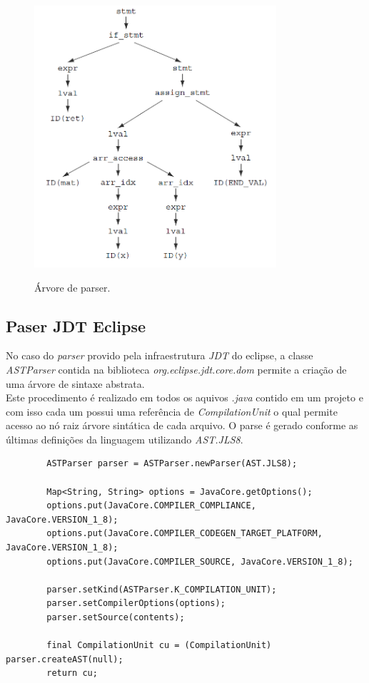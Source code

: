 	\begin{figure}[h]
		\center
		\includegraphics[width=0.8\textwidth]{Imagens/Arvore}
		\label{fig:TreeParser}
		\caption{Árvore de parser.}
	\end{figure}
	
	
	\subsection{Paser JDT Eclipse}
	No caso do \textit{parser} provido pela infraestrutura \textit{JDT} do eclipse,  a classe \textit{ASTParser} contida na biblioteca \textit{org.eclipse.jdt.core.dom} permite a criação de uma árvore de sintaxe abstrata.\\
	Este procedimento é realizado em todos os aquivos \textit{.java} contido em um projeto e com isso cada um possui uma referência de \textit{CompilationUnit} o qual permite acesso ao nó raiz árvore sintática de cada arquivo. O parse é gerado conforme as últimas definições da linguagem utilizando \textit{AST.JLS8}.\

	\begin{lstlisting}
		ASTParser parser = ASTParser.newParser(AST.JLS8);
		
		Map<String, String> options = JavaCore.getOptions();
		options.put(JavaCore.COMPILER_COMPLIANCE, JavaCore.VERSION_1_8);
		options.put(JavaCore.COMPILER_CODEGEN_TARGET_PLATFORM, JavaCore.VERSION_1_8);
		options.put(JavaCore.COMPILER_SOURCE, JavaCore.VERSION_1_8);
		
		parser.setKind(ASTParser.K_COMPILATION_UNIT);
		parser.setCompilerOptions(options);
		parser.setSource(contents);
		
		final CompilationUnit cu = (CompilationUnit) parser.createAST(null);
		return cu;
	\end{lstlisting}
	
